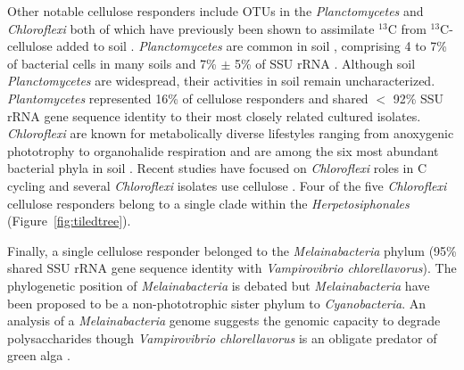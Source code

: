 \documentclass{article}
\begin{document}
Other notable cellulose responders include OTUs in the \textit{Planctomycetes}
and \textit{Chloroflexi} both of which have previously been shown to
assimilate $^{13}$C from $^{13}$C-cellulose added to soil
\citep{Schellenberger_2010}. \textit{Planctomycetes} are common in soil
\citep{Janssen2006}, comprising 4 to 7\% of bacterial cells in many soils
\citep{Zarda_1997,Chatzinotas_1998} and 7\% $\pm$ 5\% of SSU rRNA
\citep{buckley_2003}. Although soil \textit{Planctomycetes} are widespread,
their activities in soil remain uncharacterized. \textit{Plantomycetes}
represented 16\% of cellulose responders and shared $<$ 92\% SSU rRNA gene
sequence identity to their most closely related cultured isolates.
\textit{Chloroflexi} are known for metabolically diverse lifestyles ranging
from anoxygenic phototrophy to organohalide respiration \citep{Hug_2013} and
are among the six most abundant bacterial phyla in soil \citep{Janssen2006}.
Recent studies have focused on \textit{Chloroflexi} roles in C cycling
\citep{Hug_2013,Goldfarb_2011,Cole_2013} and several \textit{Chloroflexi}
isolates use cellulose \citep{Hug_2013,Goldfarb_2011,Cole_2013}. Four of the
five \textit{Chloroflexi} cellulose responders belong to a single clade within
the \textit{Herpetosiphonales} (Figure~\ref{fig:tiledtree}). 

Finally, a single cellulose responder belonged to the \textit{Melainabacteria}
phylum (95\% shared SSU rRNA gene sequence identity with \textit{Vampirovibrio
chlorellavorus}). The phylogenetic position of \textit{Melainabacteria} is
debated but \textit{Melainabacteria} have been proposed to be
a non-phototrophic sister phylum to \textit{Cyanobacteria}. An analysis of
a \textit{Melainabacteria} genome \citep{Di_Rienzi_2013} suggests the
genomic capacity to degrade polysaccharides though \textit{Vampirovibrio
chlorellavorus} is an obligate predator of green alga \citep{gromov_1972}.
\end{document}
